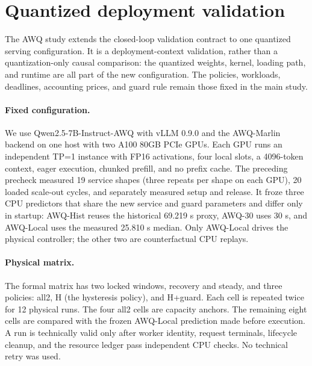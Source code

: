 \section{Quantized deployment validation}
\label{app:awq}

The AWQ study extends the closed-loop validation contract to one quantized
serving configuration. It is a deployment-context validation, rather than a
quantization-only causal comparison: the quantized weights, kernel, loading
path, and runtime are all part of the new configuration. The policies,
workloads, deadlines, accounting prices, and guard rule remain those fixed in
the main study.

\paragraph{Fixed configuration.}
We use Qwen2.5-7B-Instruct-AWQ with vLLM 0.9.0 and the AWQ-Marlin backend on
one host with two A100 80GB PCIe GPUs. Each GPU runs an independent TP=1
instance with FP16 activations, four local slots, a 4096-token context, eager
execution, chunked prefill, and no prefix cache. The preceding precheck
measured 19 service shapes (three repeats per shape on each GPU), 20 loaded
scale-out cycles, and separately measured setup and release. It froze three
CPU predictors that share the new service and guard parameters and differ only
in startup: AWQ-Hist reuses the historical 69.219 s proxy, AWQ-30 uses 30 s,
and AWQ-Local uses the measured 25.810 s median. Only AWQ-Local drives the
physical controller; the other two are counterfactual CPU replays.

\paragraph{Physical matrix.}
The formal matrix has two locked windows, recovery and steady, and three
policies: all2, H (the hysteresis policy), and H+guard. Each cell is repeated
twice for 12 physical runs. The four all2 cells are capacity anchors. The
remaining eight cells are compared with the frozen AWQ-Local prediction made
before execution. A run is technically valid only after worker identity,
request terminals, lifecycle cleanup, and the resource ledger pass independent
CPU checks. No technical retry was used.

